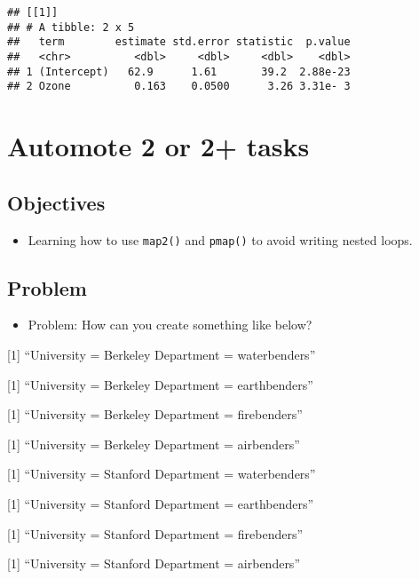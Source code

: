 \documentclass[
]{book}
\providecommand{\tightlist}{%
  \setlength{\itemsep}{0pt}\setlength{\parskip}{0pt}}
\begin{document}
\begin{verbatim}
## [[1]]
## # A tibble: 2 x 5
##   term        estimate std.error statistic  p.value
##   <chr>          <dbl>     <dbl>     <dbl>    <dbl>
## 1 (Intercept)   62.9      1.61       39.2  2.88e-23
## 2 Ozone          0.163    0.0500      3.26 3.31e- 3
\end{verbatim}

\hypertarget{automote-2-or-2-tasks}{%
\section{Automote 2 or 2+ tasks}\label{automote-2-or-2-tasks}}

\hypertarget{objectives-1}{%
\subsection{Objectives}\label{objectives-1}}

\begin{itemize}
\tightlist
\item
  Learning how to use \texttt{map2()} and \texttt{pmap()} to avoid writing nested loops.
\end{itemize}

\hypertarget{problem}{%
\subsection{Problem}\label{problem}}

\begin{itemize}
\tightlist
\item
  Problem: How can you create something like below?
\end{itemize}

{[}1{]} ``University = Berkeley \textbar{} Department = waterbenders''

{[}1{]} ``University = Berkeley \textbar{} Department = earthbenders''

{[}1{]} ``University = Berkeley \textbar{} Department = firebenders''

{[}1{]} ``University = Berkeley \textbar{} Department = airbenders''

{[}1{]} ``University = Stanford \textbar{} Department = waterbenders''

{[}1{]} ``University = Stanford \textbar{} Department = earthbenders''

{[}1{]} ``University = Stanford \textbar{} Department = firebenders''

{[}1{]} ``University = Stanford \textbar{} Department = airbenders''
\end{document}
